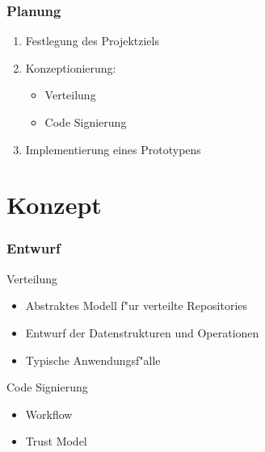 \documentclass[german]{beamer}
\begin{document}
\begin{frame}
  \frametitle{Planung}
  \begin{enumerate}
  \item Festlegung des Projektziels
  \item Konzeptionierung:
    \begin{itemize}
    \item Verteilung
    \item Code Signierung
    \end{itemize}
  \item Implementierung eines Prototypens
  \end{enumerate}
\end{frame}

\section{Konzept}

\begin{frame}
  \frametitle{Entwurf}
  \begin{block}{Verteilung}
    \begin{itemize}
    \item Abstraktes Modell f"ur verteilte Repositories
    \item Entwurf der Datenstrukturen und Operationen
    \item Typische Anwendungsf"alle
    \end{itemize}
  \end{block}
  \begin{block}{Code Signierung}
    \begin{itemize}
    \item Workflow
    \item Trust Model
    \end{itemize}
  \end{block}
\end{frame}
\end{document}
